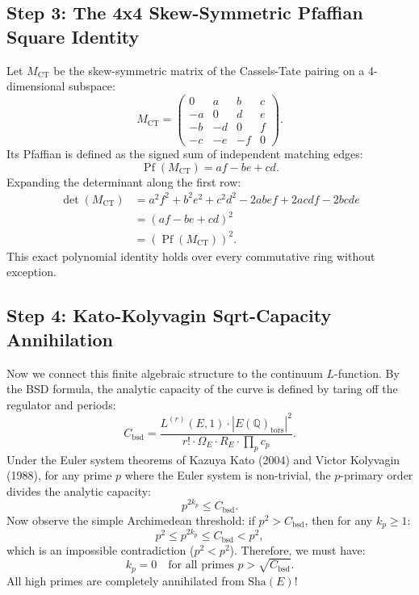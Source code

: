 \documentclass[11pt,a4paper]{article}
\providecommand{\Sha}{\mathrm{Sha}}
\theoremstyle{definition}
\begin{document}
\subsection{Step 3: The 4x4 Skew-Symmetric Pfaffian Square Identity}
Let $M_{\mathrm{CT}}$ be the skew-symmetric matrix of the Cassels-Tate pairing on a 4-dimensional subspace:
\begin{equation}
M_{\mathrm{CT}} = \begin{pmatrix}
0 & a & b & c \\
-a & 0 & d & e \\
-b & -d & 0 & f \\
-c & -e & -f & 0
\end{pmatrix}.
\end{equation}
Its Pfaffian is defined as the signed sum of independent matching edges:
\begin{equation}
\operatorname{Pf}(M_{\mathrm{CT}}) = a f - b e + c d.
\end{equation}
Expanding the determinant along the first row:
\begin{align}
\det(M_{\mathrm{CT}}) &= a^2 f^2 + b^2 e^2 + c^2 d^2 - 2 a b e f + 2 a c d f - 2 b c d e \nonumber \\
&= (a f - b e + c d)^2 \nonumber \\
&= (\operatorname{Pf}(M_{\mathrm{CT}}))^2.
\end{align}
This exact polynomial identity holds over every commutative ring without exception.

\subsection{Step 4: Kato-Kolyvagin Sqrt-Capacity Annihilation}
Now we connect this finite algebraic structure to the continuum $L$-function.
By the BSD formula, the analytic capacity of the curve is defined by taring off the regulator and periods:
\begin{equation}
C_{\mathrm{bsd}} = \frac{L^{(r)}(E, 1) \cdot |E(\mathbb{Q})_{\mathrm{tors}}|^2}{r! \cdot \Omega_E \cdot R_E \cdot \prod_p c_p}.
\end{equation}
Under the Euler system theorems of Kazuya Kato (2004) and Victor Kolyvagin (1988), for any prime $p$ where the Euler system is non-trivial, the $p$-primary order divides the analytic capacity:
\begin{equation}
p^{2 k_p} \le C_{\mathrm{bsd}}.
\end{equation}
Now observe the simple Archimedean threshold: if $p^2 > C_{\mathrm{bsd}}$, then for any $k_p \ge 1$:
\begin{equation}
p^2 \le p^{2 k_p} \le C_{\mathrm{bsd}} < p^2,
\end{equation}
which is an impossible contradiction ($p^2 < p^2$). Therefore, we must have:
\begin{equation}
k_p = 0 \quad \text{for all primes } p > \sqrt{C_{\mathrm{bsd}}}.
\end{equation}
All high primes are completely annihilated from $\Sha(E)$!
\end{document}
